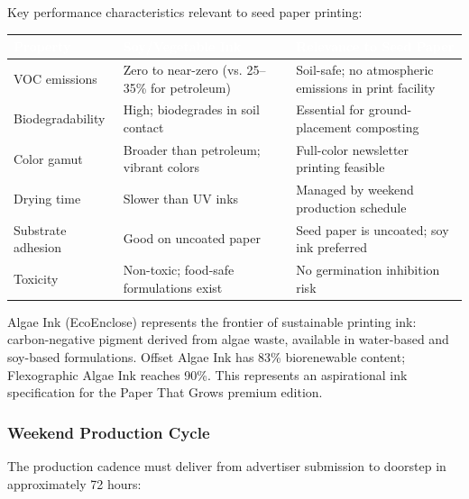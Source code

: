 \documentclass[11pt,letterpaper]{article}
\newcommand{\tableheader}[1]{\textbf{\sffamily\textcolor{white}{#1}}}
\begin{document}
Key performance characteristics relevant to seed paper printing:

\begin{center}
\begin{tabularx}{\textwidth}{L{3cm}L{3cm}X}
\toprule
{}
\tableheader{Property} & \tableheader{Soy/Vegetable Ink} & \tableheader{Relevance to Seed Paper} \\
\midrule
VOC emissions & Zero to near-zero (vs. 25--35\% for petroleum) & Soil-safe; no atmospheric emissions in print facility \\
Biodegradability & High; biodegrades in soil contact & Essential for ground-placement composting \\
Color gamut & Broader than petroleum; vibrant colors & Full-color newsletter printing feasible \\
Drying time & Slower than UV inks & Managed by weekend production schedule \\
Substrate adhesion & Good on uncoated paper & Seed paper is uncoated; soy ink preferred \\
Toxicity & Non-toxic; food-safe formulations exist & No germination inhibition risk \\
\bottomrule
\end{tabularx}
\end{center}

Algae Ink (EcoEnclose) represents the frontier of sustainable printing ink: carbon-negative pigment derived from algae waste, available in water-based and soy-based formulations. Offset Algae Ink has 83\% biorenewable content; Flexographic Algae Ink reaches 90\%. This represents an aspirational ink specification for the Paper That Grows premium edition.

\subsubsection{Weekend Production Cycle}
The production cadence must deliver from advertiser submission to doorstep in approximately 72 hours:
\end{document}

